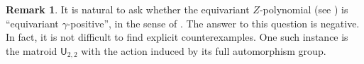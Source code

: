 \documentclass[11pt, a4paper, english]{amsart}
\theoremstyle{teoremas}
\theoremstyle{definition}
\newtheorem{definition}[theorem]{Definition}
\newtheorem{remark}[theorem]{Remark}
\DeclareMathOperator{\rk}{rk}
\newcommand{\M}{\mathsf{M}}
\newcommand{\U}{\mathsf{U}}
\newcommand{\cL}{\mathcal{L}}
\newcommand{\gr}{\operatorname{gr}}
\newcommand{\VRep}{\operatorname{VRep}}
\newcommand{\Ind}{\operatorname{Ind}}
\begin{document}
\begin{remark}
    It is natural to ask whether the equivariant $Z$-polynomial (see \cite[Section~6]{proudfoot-xu-young}) is ``equivariant $\gamma$-positive'', in the sense of \cite[Section~5.2]{athanasiadis-gamma-positivity}. The answer to this question is negative. In fact, it is not difficult to find explicit counterexamples. One such instance is the matroid $\U_{2,2}$ with the action induced by its full automorphism group. 
\end{remark}

\begin{comment}
\subsection{The equivariant case}\label{sec:equivariant}

Subtle refinements of the Kazhdan--Lusztig and the $Z$-polynomial have been introduced in \cite{gedeon-proudfoot-young-equivariant,proudfoot-xu-young}, and extensively studied in the literature, for example \cite{proudfoot-equivariant1,proudfoot-equivariant2,xie-zhang}. They are equivariant analogues that keep track of the symmetries of the matroid. Let us recall their definitions. Whenever a group $W$ acts on the ground set of $\M$ preserving its family of bases, we will write $W \curvearrowright \M$.

\begin{definition}
    There is a unique way of associating to each loopless matroid $\M$ and each group action $W\curvearrowright \M$, two graded virtual representations $P_\M^W(x), Z_\M^W(x) \in \gr\VRep(W)$ in such a way that
    \begin{enumerate}[\normalfont(i)]
        \item If $\rk(\M) = 0$, then $P_\M^W(x) = Z_\M^W(x) = \tau_W$.
        \item If $\rk(\M) > 0$, then $\deg P_\M^W(x) < \frac{1}{2}\rk(\M)$.
        \item For every $\M$,
        \[Z_\M^W(x) = \sum_{[F] \in \cL (\M)/W} x^{\rk(F)} \Ind_{W_F}^W P_{\M/F}^{W_F}(x)\]
        is palindromic and has degree $\rk(\M)$.
    \end{enumerate}
    Here, $\tau_W$ is the trivial representation of $W$, $W_F$ is the stabilizer of $F$, and $\mathcal{L}(\M)/W$ denotes the quotient of the lattice of flats of $\M$ by the group action $W$.
\end{definition}

\begin{remark}
    The graded representations resulting from the above statement may be viewed as a kind of categorification of the ordinary Kazhdan--Lusztig polynomial $P_\M(x)$ and $Z$-polynomial $Z_\M(x)$. In fact, one has
        \[
            [x^i]P_\M(x) = \dim \left([x^i] P_\M^W(x)\right)
        \]
    for every group action $W \curvearrowright \M$, and similarly for $Z_\M^W(x)$. In particular, if one considers $W$ to be a single-element group, one recovers exactly the ordinary polynomials.
\end{remark}


\end{comment}
\end{document}
